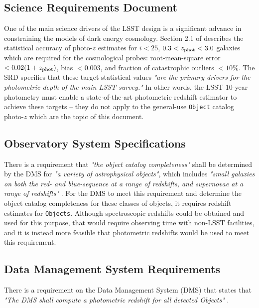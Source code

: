 \documentclass[DM,lsstdraft,toc]{lsstdoc}
\begin{document}
\subsection{Science Requirements Document}\label{ssec:docs_srd}

One of the main science drivers of the LSST design is a significant advance in constraining the models of dark energy cosmology. 
Section 2.1 of  describes the statistical accuracy of photo-$z$ estimates for $i<25$, $0.3<z_{\rm phot}<3.0$ galaxies which are required for the cosmological probes: root-mean-square error $<0.02(1+z_{\rm phot})$, bias $<0.003$, and fraction of catastrophic outliers $<10\%$.
The SRD specifies that these target statistical values {\it "are the primary drivers for the photometric depth of the main LSST survey."} 
In other words, the LSST 10-year photometry must enable a state-of-the-art photometric redshift estimator to achieve these targets -- they do not apply to the general-use {\tt Object} catalog photo-$z$ which are the topic of this document.

\subsection{Observatory System Specifications}\label{ssec:docs_oss}

There is a requirement that {\it "the object catalog completeness"} shall be determined by the DMS for {\it "a variety of astrophysical objects"}, which includes {\it "small galaxies on both the red- and blue-sequence at a range of redshifts, and supernovae at a range of redshifts"} . 
For the DMS to meet this requirement and determine the object catalog completeness for these classes of objects, it requires redshift estimates for {\tt Objects}.
Although spectroscopic redshifts could be obtained and used for this purpose, that would require observing time with non-LSST facilities, and it is instead more feasible that photometric redshifts would be used to meet this requirement.

\subsection{Data Management System Requirements}\label{ssec:docs_dmsr}

There is a requirement on the Data Management System (DMS) that states that {\it "The DMS shall compute a photometric redshift for all detected Objects"} . 
\end{document}
